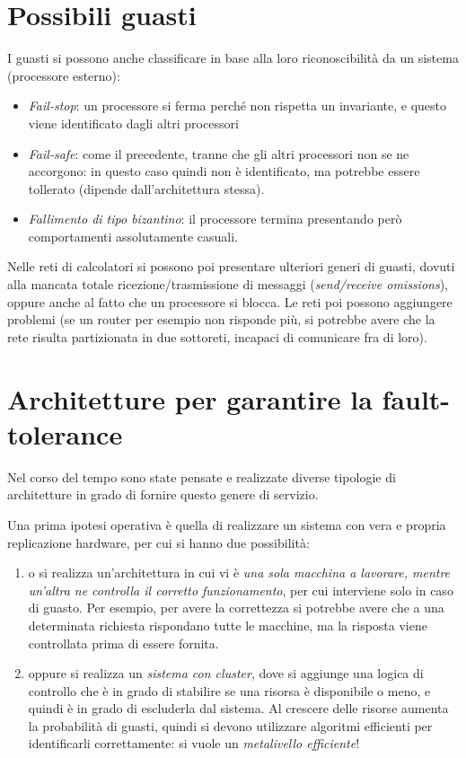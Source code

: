 \section{Possibili guasti}
I guasti si possono anche classificare in base alla loro riconoscibilità da un
sistema (processore esterno):
\begin{itemize}
 \item \textit{Fail-stop}: un processore si ferma perché non rispetta un
 invariante, e questo viene identificato dagli  altri processori
 \item \textit{Fail-safe}: come il precedente, tranne che gli altri processori
 non se ne accorgono: in questo caso quindi non è identificato, ma potrebbe
essere tollerato (dipende dall'architettura stessa).
 \item \textit{Fallimento di tipo bizantino}: il processore termina presentando
però comportamenti assolutamente casuali.
\end{itemize}
Nelle reti di calcolatori si possono poi presentare ulteriori generi di guasti,
dovuti alla mancata totale ricezione/trasmissione di messaggi
(\textit{send/receive omissions}), oppure anche al fatto che un processore si
blocca. Le reti poi possono aggiungere problemi (se un router per esempio non
risponde più, si potrebbe avere che la
rete risulta partizionata in due sottoreti, incapaci di comunicare fra di loro).
\section{Architetture per garantire la fault-tolerance}
Nel corso del tempo sono state pensate e realizzate diverse tipologie di
architetture in grado di fornire questo genere
di servizio.

Una prima ipotesi operativa è quella di realizzare un sistema con vera e
propria replicazione hardware, per cui si
hanno due possibilità:
\begin{enumerate}
 \item o si realizza un'architettura in cui vi è \textit{una sola macchina a
 lavorare, mentre un'altra ne controlla il corretto  funzionamento}, per cui
 interviene solo in caso di guasto. Per esempio, per avere la correttezza si
 potrebbe  avere che a una determinata richiesta rispondano tutte le macchine,
 ma la risposta viene controllata prima di essere fornita.
 \item oppure si realizza un \textit{sistema con cluster}, dove si aggiunge una
 logica di controllo che è in grado di stabilire se una risorsa è disponibile o
 meno, e  quindi è in grado di escluderla dal sistema. Al crescere delle risorse
 aumenta la probabilità di guasti, quindi si devono utilizzare algoritmi
 efficienti per identificarli correttamente: si vuole un \textit{metalivello
 efficiente}!
\end{enumerate}

